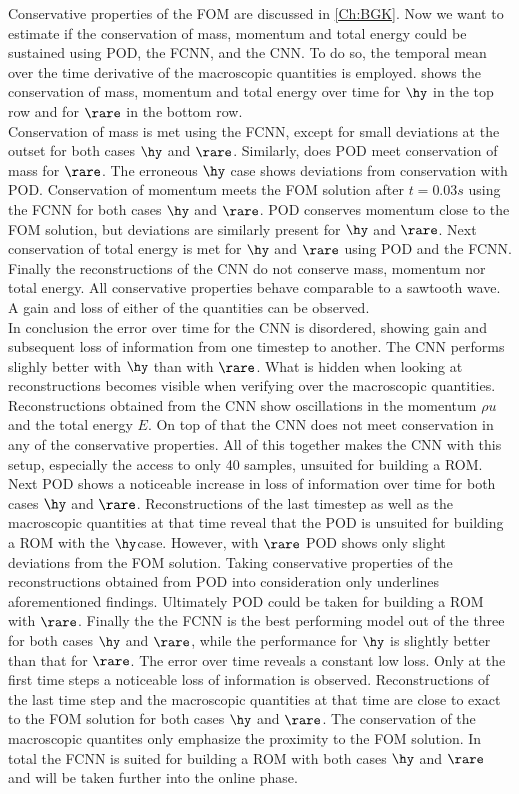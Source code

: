 Conservative properties of the FOM are discussed in \cref{Ch:BGK}. Now we want to estimate if the conservation of mass, momentum and total energy could be sustained using POD, the FCNN, and the CNN. To do so, the temporal mean over the time derivative of the macroscopic quantities is employed.  shows the conservation of mass, momentum and total energy over time for \(\hy\) in the top row and for \(\rare\) in the bottom row.\\
Conservation of mass is met using the FCNN, except for small deviations at the outset for both cases \(\hy\) and \(\rare\). Similarly, does POD meet conservation of mass for \(\rare\). The erroneous \(\hy\) case shows deviations from conservation with POD. Conservation of momentum meets the FOM solution after \(t=0.03s\) using the FCNN for both cases \(\hy\) and \(\rare\). POD conserves momentum close to the FOM solution, but deviations are similarly present for \(\hy\) and \(\rare\). Next conservation of total energy is met for \(\hy\) and \(\rare\) using POD and the FCNN. Finally the reconstructions of the CNN do not conserve mass, momentum nor total energy. All conservative properties behave comparable to a sawtooth wave. A gain and loss of either of the quantities can be observed.\\
In conclusion the error over time for the CNN is disordered, showing gain and subsequent loss of information from one timestep to another. The CNN performs slighly better with \(\hy\) than with \(\rare\). What is hidden when looking at reconstructions becomes visible when verifying over the macroscopic quantities. Reconstructions obtained from the CNN show oscillations in the momentum \(\rho u\) and the total energy \(E\). On top of that the CNN does not meet conservation in any of the conservative properties. All of this together makes the CNN with this setup, especially the access to only 40 samples, unsuited for building a ROM. Next POD shows a noticeable increase in loss of information over time for both cases \(\hy\) and \(\rare\). Reconstructions of the last timestep as well as the macroscopic quantities at that time reveal that the POD is unsuited for building a ROM with the \(\hy\)case. However, with \(\rare\) POD shows only slight deviations from the FOM solution. Taking conservative properties of the reconstructions obtained from POD into consideration only underlines aforementioned findings. Ultimately POD could be taken for building a ROM with \(\rare\). Finally the the FCNN is the best performing model out of the three for both cases \(\hy\) and \(\rare\), while the performance for \(\hy\) is slightly better than that for \(\rare\). The error over time reveals a constant low loss. Only at the first time steps a noticeable loss of information is observed. Reconstructions of the last time step and the macroscopic quantities at that time are close to exact to the FOM solution for both cases \(\hy\) and \(\rare\). The conservation of the macroscopic quantites only emphasize the proximity to the FOM solution. In total the FCNN is suited for building a ROM with both cases \(\hy\) and \(\rare\) and will be taken further into the online phase.\\
